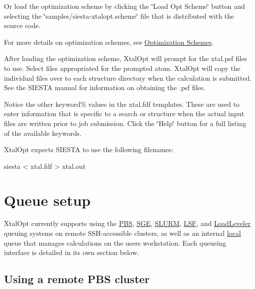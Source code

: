 \begin{DoxyCode}
\end{DoxyCode}


Or load the optimization scheme by clicking the \char`\"{}\+Load Opt Scheme\char`\"{} button and selecting the \char`\"{}samples/siesta-\/xtalopt.\+scheme\char`\"{} file that is distributed with the source code.

For more details on optimization schemes, see \hyperlink{optschemes}{Optimization Schemes}.

After loading the optimization scheme, Xtal\+Opt will prompt for the xtal.\+psf files to use. Select files appropriated for the prompted atom. Xtal\+Opt will copy the individual files over to each structure directory when the calculation is submitted. See the S\+I\+E\+S\+T\+A manual for information on obtaining the .psf files.

Notice the other keyword\% values in the xtal.\+fdf templates. These are used to enter information that is specific to a search or structure when the actual input files are written prior to job submission. Click the \char`\"{}\+Help\char`\"{} button for a full listing of the available keywords.

Xtal\+Opt expects S\+I\+E\+S\+T\+A to use the following filenames\+:


\begin{DoxyPre}siesta < xtal.fdf > xtal.out\end{DoxyPre}
\hypertarget{tut-xo_qisetup}{}\section{Queue setup}\label{tut-xo_qisetup}
Xtal\+Opt currently supports using the \hyperlink{tut-xo_remotepbs}{P\+B\+S}, \hyperlink{tut-xo_remotesge}{S\+G\+E}, \hyperlink{tut-xo_remoteslurm}{S\+L\+U\+R\+M}, \hyperlink{tut-xo_remotelsf}{L\+S\+F}, and \hyperlink{tut-xo_remotell}{Load\+Leveler} queuing systems on remote S\+S\+H-\/accessible clusters, as well as an internal \hyperlink{tut-xo_localqi}{local} queue that manages calculations on the user\textquotesingle{}s workstation. Each queueing interface is detailed in its own section below.\hypertarget{tut-xo_remotepbs}{}\subsection{Using a remote P\+B\+S cluster}\label{tut-xo_remotepbs}
 
